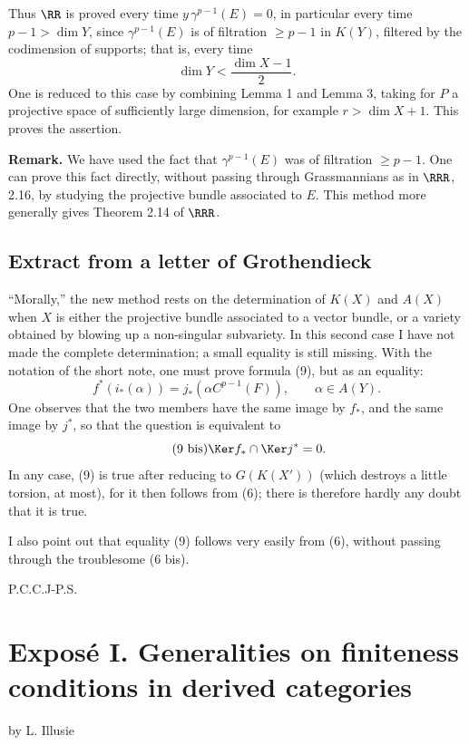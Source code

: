 Thus \(\RR\) is proved every time \(y\,\gamma^{p-1}(E)=0\), in particular every time \(p-1>\dim Y\), since \(\gamma^{p-1}(E)\) is of filtration \(\geq p-1\) in \(K(Y)\), filtered by the codimension of supports; that is, every time
\[
  \dim Y < \frac{\dim X-1}{2}.
\]
One is reduced to this case by combining Lemma 1 and Lemma 3, taking for \(P\) a projective space of sufficiently large dimension, for example \(r>\dim X+1\). This proves the assertion.

\textbf{Remark.} We have used the fact that \(\gamma^{p-1}(E)\) was of filtration \(\geq p-1\). One can prove this fact directly, without passing through Grassmannians as in \(\RRR\), 2.16, by studying the projective bundle associated to \(E\). This method more generally gives Theorem 2.14 of \(\RRR\).

\subsection*{Extract from a letter of Grothendieck}
``Morally,'' the new method rests on the determination of \(K(X)\) and \(A(X)\) when \(X\) is either the projective bundle associated to a vector bundle, or a variety obtained by blowing up a non-singular subvariety. In this second case I have not made the complete determination; a small equality is still missing. With the notation of the short note, one must prove formula (9), but as an equality:
\begin{equation}\tag{9}
  f^*(i_*(\alpha))=j_*(\alpha C^{p-1}(F)),\qquad \alpha\in A(Y).
\end{equation}
One observes that the two members have the same image by \(f_*\), and the same image by \(j^*\), so that the question is equivalent to
\begin{equation}\tag{9 bis}
  \Ker f_*\cap\Ker j^*=0.
\end{equation}
In any case, (9) is true after reducing to \(G(K(X'))\) (which destroys a little torsion, at most), for it then follows from (6); there is therefore hardly any doubt that it is true.

I also point out that equality (9) follows very easily from (6), without passing through the troublesome (6 bis).

\begin{flushleft}
P.C.C.J-P.S.
\end{flushleft}

\newpage
\section*{Exposé I. Generalities on finiteness conditions in derived categories}
\begin{center}
by L. Illusie
\end{center}

